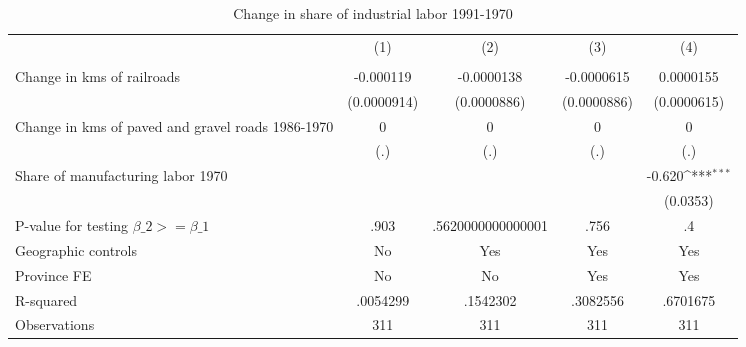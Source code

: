 \begin{table}[htbp]\centering
\def\sym#1{\ifmmode^{#1}\else\(^{#1}\)\fi}
\caption{Change in share of industrial labor 1991-1970}
\begin{tabular}{l*{4}{c}}
\hline\hline
                &\multicolumn{1}{c}{(1)}&\multicolumn{1}{c}{(2)}&\multicolumn{1}{c}{(3)}&\multicolumn{1}{c}{(4)}\\
                &\multicolumn{1}{c}{}&\multicolumn{1}{c}{}&\multicolumn{1}{c}{}&\multicolumn{1}{c}{}\\
\hline
Change in kms of railroads&-0.000119         &-0.0000138         &-0.0000615         &0.0000155         \\
                &(0.0000914)         &(0.0000886)         &(0.0000886)         &(0.0000615)         \\
[1em]
Change in kms of paved and gravel roads 1986-1970&        0         &        0         &        0         &        0         \\
                &      (.)         &      (.)         &      (.)         &      (.)         \\
[1em]
Share of manufacturing labor 1970&                  &                  &                  &   -0.620\sym{***}\\
                &                  &                  &                  & (0.0353)         \\
\hline
P-value for testing $\beta\_{2} >= \beta\_{1}$&     .903         &.5620000000000001         &     .756         &       .4         \\
Geographic controls&       No         &      Yes         &      Yes         &      Yes         \\
Province FE     &       No         &       No         &      Yes         &      Yes         \\
R-squared       & .0054299         & .1542302         & .3082556         & .6701675         \\
Observations    &      311         &      311         &      311         &      311         \\
\hline\hline
\end{tabular}
\end{table}

